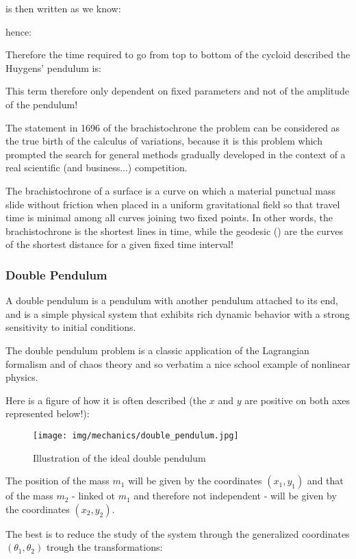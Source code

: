 	is then written as we know:
	
	hence:
	
	Therefore the time required to go from top to bottom of the cycloid described the Huygens' pendulum is:
	
	This term therefore only dependent on fixed parameters and not of the amplitude of the pendulum!
	
	The statement in 1696 of the brachistochrone the problem can be considered as the true birth of the calculus of variations, because it is this problem which prompted the search for general methods gradually developed in the context of a real scientific (and business...) competition.
	\begin{tcolorbox}[title=Remark,colframe=black,arc=10pt]
	The brachistochrone of a surface is a curve on which a material  punctual mass slide without friction when placed in a uniform gravitational field so that travel time is minimal among all curves joining two fixed points. In other words, the brachistochrone  is the shortest lines in time, while the geodesic () are the curves of the shortest distance for a given fixed time interval!
	\end{tcolorbox}
	
	\subsubsection{Double Pendulum}
	A double pendulum is a pendulum with another pendulum attached to its end, and is a simple physical system that exhibits rich dynamic behavior with a strong sensitivity to initial conditions.

	The double pendulum problem is a classic application of the Lagrangian formalism and of chaos theory and so verbatim a nice school example of nonlinear physics.

	Here is a figure of how it is often described (the $x$ and $y$ are positive on both axes represented below!):
	\begin{figure}[H]
		\centering
		\texttt{[image: img/mechanics/double\_pendulum.jpg]}
		\caption{Illustration of the ideal double pendulum}
	\end{figure}
	The position of the mass $m_1$ will be given by the coordinates $(x_1,y_1)$ and that of the mass $m_2$ - linked ot $m_1$ and therefore not independent - will be given by the coordinates $(x_2,y_2)$.

	The best is to reduce the study of the system through the generalized coordinates $(\theta_1,\theta_2)$ trough the transformations:
	
